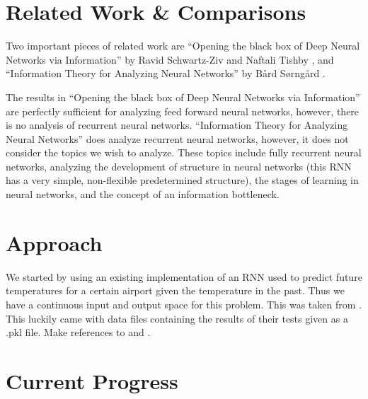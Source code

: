 \section{Related Work \& Comparisons}
Two important pieces of related work are “Opening the black box of Deep Neural
Networks via Information” by Ravid Schwartz-Ziv and Naftali Tishby
\cite{black_box}, and “Information Theory for Analyzing
Neural Networks” by B\aa rd S\o rng\aa rd \cite{ntnu}.

The results in “Opening the black box of Deep Neural Networks via Information” are perfectly sufficient for analyzing feed forward neural networks, however, there is no analysis of recurrent neural networks. “Information Theory for Analyzing Neural Networks” does analyze recurrent neural networks, however, it does not consider the topics we wish to analyze. These topics include fully recurrent neural networks, analyzing the development of structure in neural networks (this RNN has a very simple, non-flexible predetermined structure), the stages of learning in neural networks, and the concept of an information bottleneck. 

\section{Approach}
We started by using an existing implementation of an RNN used to predict future
temperatures for a certain airport given the temperature in the past. Thus we
have a continuous input and output space for this problem. This was taken from
\cite{weather}. This luckily came with data files containing the results of
their tests given as a .pkl file.
Make references to \cite{disentangling_representations} and
\cite{info_bottleneck}.

\section{Current Progress}

